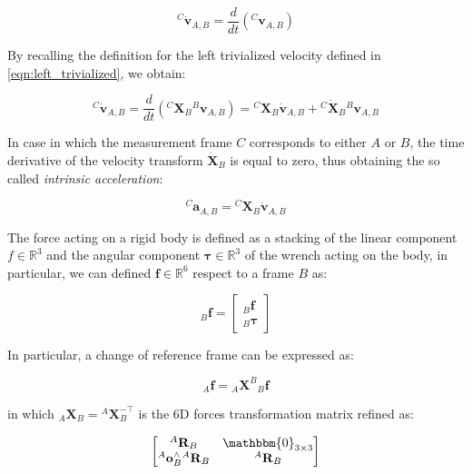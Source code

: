 \begin{equation}
    {}^C\dot{\mathbf{v}}_{A,B} = \frac{d}{dt}\left( {}^C \mathbf{v}_{A,B}\right)
\end{equation}

By recalling the definition for the left trivialized velocity defined in \cref{eqn:left_trivialized}, we obtain:

\begin{equation}
    {}^C\dot{\mathbf{v}} _{A,B} = \frac{d}{dt} \left({}^C \mathbf{X}_B {}^B\mathbf{v}_{A,B} \right) = {}^C \mathbf{X}_B \dot{\mathbf{v}}_{A,B} + {}^C \dot{\mathbf{X}}_B {}^B\mathbf{v}_{A,B}
\end{equation}

In case in which the measurement frame $C$ corresponds to either $A$ or $B$, the time derivative of the velocity transform $\dot{\mathbf{X}}_B$ is equal to zero, thus obtaining the so called \textit{intrinsic acceleration}:

\begin{equation}
    {}^C\mathbf{a}_{A,B} = {}^C \mathbf{X}_B \dot{\mathbf{v}}_{A,B}
\end{equation}

The force acting on a rigid body is defined as a stacking of the linear component $f \in \mathbb{R}^3$ and the angular component $\boldsymbol{\tau} \in \mathbb{R}^3$ of the wrench acting on the body, in particular, we can defined $\mathbf{f} \in \mathbb{R}^6$ respect to a frame $B$ as:

\begin{equation}
    {}_{B}\mathbf{f} = \begin{bmatrix}
        {}_{B}\boldsymbol{f} \\
        {}_{B}\boldsymbol{\tau}
    \end{bmatrix}
\end{equation}

In particular, a change of reference frame can be expressed as:

\begin{equation}
    {}_{A}\mathbf{f} = {}_{A}\mathbf{X}^B {}_{B}\mathbf{f}
\end{equation}

in which ${}_{A}\mathbf{X}_B = {}^A\mathbf{X}_B ^{-\top}$ is the $6$D forces transformation matrix refined as:

\begin{equation}
    \begin{bmatrix}
        {}^A\mathbf{R}_B                         & \mathbbm{0}_{3 \times 3} \\
        {}^A\mathbf{o}_B^\wedge {}^A\mathbf{R}_B & {}^A\mathbf{R}_B
    \end{bmatrix}
\end{equation}

